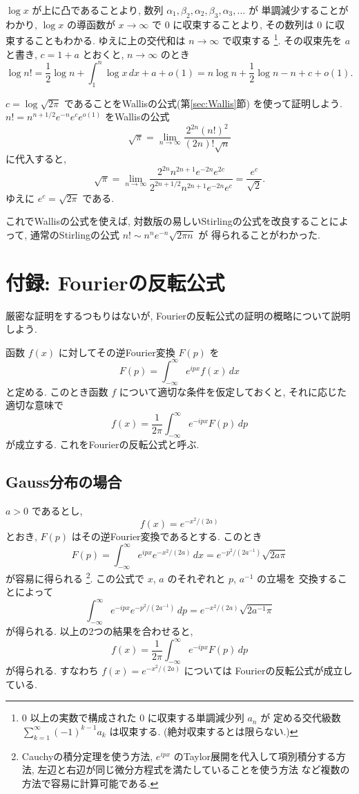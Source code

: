 \documentclass[12pt,twoside]{jarticle}
\theoremstyle{jplain}
\theoremstyle{jplain}
\theoremstyle{jplain}
\numberwithin{theorem}{section}
\numberwithin{equation}{section}
\numberwithin{figure}{section}
\numberwithin{table}{section}
\newcommand\secref[1]{第\ref{#1}節}
\begin{document}
$\log x$ が上に凸であることより,
数列 $\alpha_1,\beta_2,\alpha_2,\beta_3,\alpha_3,\ldots$ が
単調減少することがわかり,
$\log x$ の導函数が $x\to\infty$ で $0$ に収束することより,
その数列は $0$ に収束することもわかる.
ゆえに上の交代和は $n\to\infty$ で収束する%
\footnote{$0$ 以上の実数で構成された $0$ に収束する単調減少列 $a_n$ が
定める交代級数 $\sum_{k=1}^\infty (-1)^{k-1}a_k$ は収束する.
(絶対収束するとは限らない.)}.
その収束先を $a$ と書き, $c=1+a$ とおくと, $n\to\infty$ のとき
\[
\log n!
= \frac{1}{2}\log n + \int_1^n\log x\,dx + a + o(1)
= n\log n +\frac{1}{2}\log n - n + c + o(1).
\]

$c=\log\sqrt{2\pi}$ であることをWallisの公式(\secref{sec:Wallis})
を使って証明しよう.
$n!=n^{n+1/2}e^{-n}e^ce^{o(1)}$ をWallisの公式
\[
\sqrt{\pi}=\lim_{n\to\infty}\frac{2^{2n}(n!)^2}{(2n)!\sqrt{n}}
\]
に代入すると,
\[
\sqrt{\pi}
=\lim_{n\to\infty}
\frac{2^{2n}n^{2n+1}e^{-2n}e^{2c}}{2^{2n+1/2}n^{2n+1}e^{-2n}e^c}
=\frac{e^c}{\sqrt{2}}.
\]
ゆえに $e^c=\sqrt{2\pi}$ である.

これでWallisの公式を使えば,
対数版の易しいStirlingの公式を改良することによって,
通常のStirlingの公式 $n!\sim n^n e^{-n}\sqrt{2\pi n}$ が
得られることがわかった.


\section{付録: Fourierの反転公式}
\label{sec:Fourier}

厳密な証明をするつもりはないが,
Fourierの反転公式の証明の概略について説明しよう.

函数 $f(x)$ に対してその逆Fourier変換 $F(p)$ を
\[
F(p) = \int_{-\infty}^\infty e^{ipx} f(x)\,dx
\]
と定める. このとき函数 $f$ について適切な条件を仮定しておくと,
それに応じた適切な意味で
\[
f(x) = \frac{1}{2\pi}\int_{-\infty}^\infty e^{-ipx} F(p)\,dp
\]
が成立する. これをFourierの反転公式と呼ぶ.

\subsection{Gauss分布の場合}

$a>0$ であるとし,
\[
f(x)=e^{-x^2/(2a)}
\]
とおき, $F(p)$ はその逆Fourier変換であるとする. このとき
\[
F(p)
=\int_{-\infty}^\infty e^{ipx} e^{-x^2/(2a)}\, dx
=e^{-p^2/(2a^{-1})}\sqrt{2a\pi}
\]
が容易に得られる%
\footnote{Cauchyの積分定理を使う方法,
$e^{ipx}$ のTaylor展開を代入して項別積分する方法,
左辺と右辺が同じ微分方程式を満たしていることを使う方法
など複数の方法で容易に計算可能である.}. %
この公式で $x$, $a$ のそれぞれと $p$, $a^{-1}$ の立場を
交換することによって
\[
\int_{-\infty}^\infty e^{-ipx} e^{-p^2/(2a^{-1})}\, dp
=e^{-x^2/(2a)}\sqrt{2a^{-1}\pi}
\]
が得られる. 以上の2つの結果を合わせると,
\[
 f(x) = \frac{1}{2\pi}\int_{-\infty}^\infty e^{-ipx} F(p)\,dp
\]
が得られる. すなわち $f(x)=e^{-x^2/(2a)}$ については
Fourierの反転公式が成立している.
\end{document}
